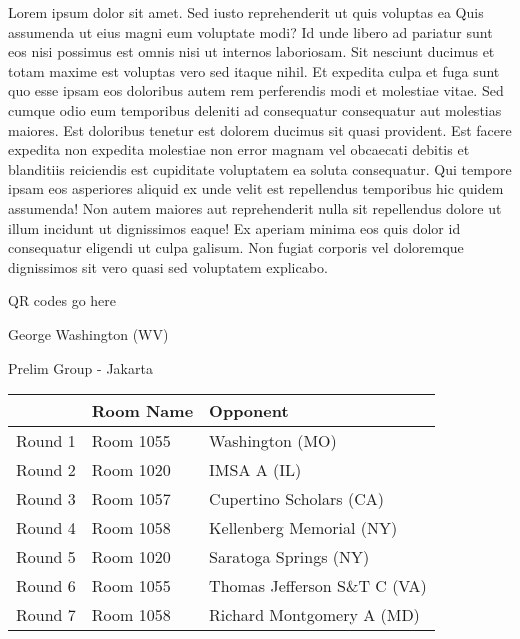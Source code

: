 \documentclass{article}%
\begin{document}
\vspace*{8pt}%
\linebreak%
\newline%
\newline%
Lorem ipsum dolor sit amet. Sed iusto reprehenderit ut quis voluptas ea Quis assumenda ut eius magni eum voluptate modi? Id unde libero ad pariatur sunt eos nisi possimus est omnis nisi ut internos laboriosam. Sit nesciunt ducimus et totam maxime est voluptas vero sed itaque nihil. Et expedita culpa et fuga sunt quo esse ipsam eos doloribus autem rem perferendis modi et molestiae vitae.\newline%
\newline%
Sed cumque odio eum temporibus deleniti ad consequatur consequatur aut molestias maiores. Est doloribus tenetur est dolorem ducimus sit quasi provident. Est facere expedita non expedita molestiae non error magnam vel obcaecati debitis et blanditiis reiciendis est cupiditate voluptatem ea soluta consequatur. Qui tempore ipsam eos asperiores aliquid ex unde velit est repellendus temporibus hic quidem assumenda!\newline%
\newline%
Non autem maiores aut reprehenderit nulla sit repellendus dolore ut illum incidunt ut dignissimos eaque! Ex aperiam minima eos quis dolor id consequatur eligendi ut culpa galisum. Non fugiat corporis vel doloremque dignissimos sit vero quasi sed voluptatem explicabo.\newline%
\newline%
%
\vspace*{30pt}%
\begin{center}%
\begin{Huge}%
QR codes go here%
\end{Huge}%
\end{center}%
\newpage%
%
\begin{center}%
\begin{Huge}%
George Washington (WV)%
\end{Huge}%
\vspace*{8pt}%
\linebreak%
\begin{Large}%
Prelim Group {-} Jakarta%
\end{Large}%
\end{center}%
\begin{tabularx}{\textwidth}{|c|Y|Y|}%
\hline%
&Room Name&Opponent\\%
\hline%
Round 1&Room 1055&Washington (MO)\\%
Round 2&Room 1020&IMSA A (IL)\\%
Round 3&Room 1057&Cupertino Scholars (CA)\\%
Round 4&Room 1058&Kellenberg Memorial (NY)\\%
Round 5&Room 1020&Saratoga Springs (NY)\\%
Round 6&Room 1055&Thomas Jefferson S\&T C (VA)\\%
Round 7&Room 1058&Richard Montgomery A (MD)\\%
\hline%
\end{tabularx}%
\end{document}
